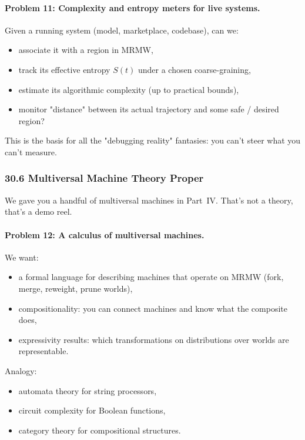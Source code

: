 \paragraph{Problem 11: Complexity and entropy meters for live systems.}

Given a running system (model, marketplace, codebase), can we:

\begin{itemize}
  \item associate it with a region in MRMW,
  \item track its effective entropy $S(t)$ under a chosen coarse-graining,
  \item estimate its algorithmic complexity (up to practical bounds),
  \item monitor "distance" between its actual trajectory and some safe / desired region?
\end{itemize}

This is the basis for all the "debugging reality" fantasies: you can’t steer what you can’t measure.

\subsubsection*{30.6  Multiversal Machine Theory Proper}

We gave you a handful of multiversal machines in Part~IV.
That’s not a theory, that’s a demo reel.

\paragraph{Problem 12: A calculus of multiversal machines.}

We want:

\begin{itemize}
  \item a formal language for describing machines that operate on MRMW (fork, merge, reweight, prune worlds),
  \item compositionality: you can connect machines and know what the composite does,
  \item expressivity results: which transformations on distributions over worlds are representable.
\end{itemize}

Analogy:

\begin{itemize}
  \item automata theory for string processors,
  \item circuit complexity for Boolean functions,
  \item category theory for compositional structures.
\end{itemize}


